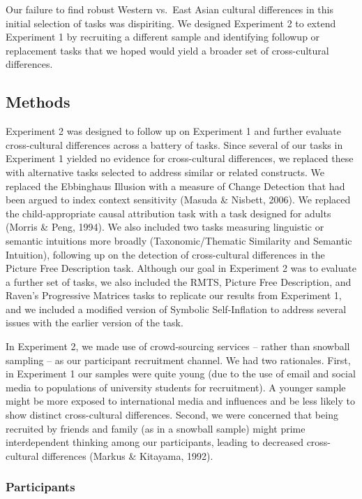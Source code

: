 \documentclass[
  man,floatsintext]{apa6}
\begin{document}
Our failure to find robust Western vs.~East Asian cultural differences in this initial selection of tasks was dispiriting. We designed Experiment 2 to extend Experiment 1 by recruiting a different sample and identifying followup or replacement tasks that we hoped would yield a broader set of cross-cultural differences.

\hypertarget{methods-1}{%
\subsection{Methods}\label{methods-1}}

Experiment 2 was designed to follow up on Experiment 1 and further evaluate cross-cultural differences across a battery of tasks. Since several of our tasks in Experiment 1 yielded no evidence for cross-cultural differences, we replaced these with alternative tasks selected to address similar or related constructs. We replaced the Ebbinghaus Illusion with a measure of Change Detection that had been argued to index context sensitivity (Masuda \& Nisbett, 2006). We replaced the child-appropriate causal attribution task with a task designed for adults (Morris \& Peng, 1994). We also included two tasks measuring linguistic or semantic intuitions more broadly (Taxonomic/Thematic Similarity and Semantic Intuition), following up on the detection of cross-cultural differences in the Picture Free Description task. Although our goal in Experiment 2 was to evaluate a further set of tasks, we also included the RMTS, Picture Free Description, and Raven's Progressive Matrices tasks to replicate our results from Experiment 1, and we included a modified version of Symbolic Self-Inflation to address several issues with the earlier version of the task.

In Experiment 2, we made use of crowd-sourcing services -- rather than snowball sampling -- as our participant recruitment channel. We had two rationales. First, in Experiment 1 our samples were quite young (due to the use of email and social media to populations of university students for recruitment). A younger sample might be more exposed to international media and influences and be less likely to show distinct cross-cultural differences. Second, we were concerned that being recruited by friends and family (as in a snowball sample) might prime interdependent thinking among our participants, leading to decreased cross-cultural differences (Markus \& Kitayama, 1992).

\hypertarget{participants-1}{%
\subsubsection{Participants}\label{participants-1}}
\end{document}
